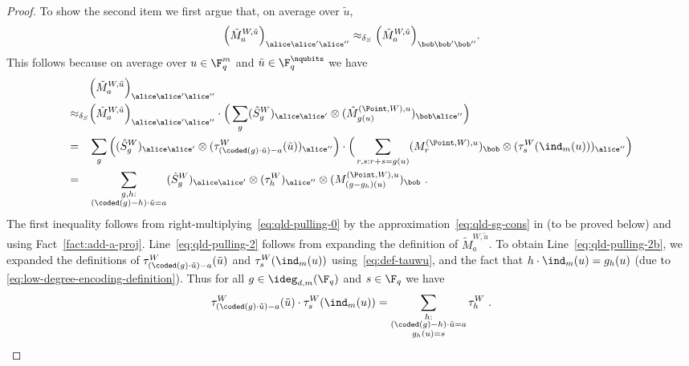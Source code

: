 \begin{proof}
To show the second item we first argue that, on average over $\tilde{u}$, 
	\begin{equation}
		\label{eq:qld-pulling-cons}
		\Big ( \tilde{M}^{W,\tilde{u}}_a \Big)_{\alice \alice' \alice''} \approx_{\delta_S} \Big ( \tilde{M}^{W,\tilde{u}}_a \Big)_{\bob \bob' \bob''}.
	\end{equation}
	This follows because on average over $u \in \F_q^m$ and $\tilde{u} \in \F_q^\nqubits$ we have
	\begin{align}
		&\Big ( \tilde{M}^{W,\tilde{u}}_a \Big)_{\alice \alice' \alice''} \label{eq:qld-pulling-0} \\
		\approx_{\delta_S}& \Big ( \tilde{M}^{W,\tilde{u}}_a \Big)_{\alice \alice'\alice''} \cdot \Big ( \sum_g (\hat{S}^W_g)_{\alice \alice'} \otimes  (\hat{M}^{(\Point,W),u}_{g(u)})_{\bob \alice''} \Big) \label{eq:qld-pulling-1} \\
		=_{\phantom{\delta_S}}& \sum_g \Big ( (\hat{S}^W_g)_{\alice \alice'} \otimes (\tau^W_{(\coded(g) \cdot \tilde{u}) - a}(\tilde{u}))_{\alice''} \Big) \cdot \Big(\sum_{r,s: r + s = g(u)} (M^{(\Point,W),u}_r)_{\bob} \otimes (\tau_s^W(\ind_m(u)))_{\alice''} \Big) \label{eq:qld-pulling-2} \\
		=_{\phantom{\delta_S}}& \sum_{\substack{g,h: \\ (\coded(g)-h)\cdot \tilde{u} = a}}  (\hat{S}^W_g)_{\alice \alice'} \otimes (\tau^W_h)_{\alice''} \otimes (M^{(\Point,W),u}_{(g-g_h)(u)})_{\bob}~. \label{eq:qld-pulling-2b}
	\end{align}
	The first inequality follows from right-multiplying~\eqref{eq:qld-pulling-0} by the approximation~\eqref{eq:qld-sg-cons} in  (to be proved below) and using Fact~\ref{fact:add-a-proj}. Line~\eqref{eq:qld-pulling-2} follows from expanding the definition of $\tilde{M}^{W,\tilde{u}}_a$.  To obtain Line~\eqref{eq:qld-pulling-2b}, we expanded the definitions of $\tau^W_{(\coded(g) \cdot \tilde{u}) - a}(\tilde{u})$ and $\tau^W_s(\ind_m(u))$ using~\cref{eq:def-tauwu}, and the fact that $h \cdot \ind_m(u) = g_h(u)$ (due to \cref{eq:low-degree-encoding-definition}). Thus for all $g \in \ideg_{d,m}(\F_q)$ and $s \in \F_q$ we have
	\[
		\tau^W_{(\coded(g) \cdot \tilde{u}) - a}(\tilde{u}) \cdot \tau^W_s(\ind_m(u)) = \sum_{\substack{h: \\ (\coded(g) - h) \cdot \tilde{u} = a \\ g_h(u) = s}} \tau^W_h~.
	\]



\end{proof}
